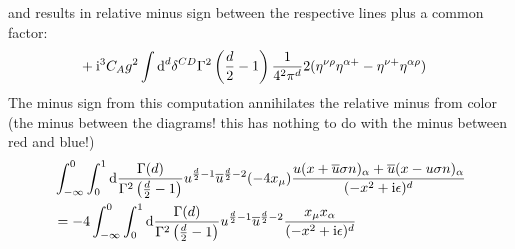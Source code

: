and results in relative minus sign between the respective lines plus a common factor:
\begin{align}
	&+\text{i}^3 C_A g^2 \int \text{d} ^d \delta^{CD}\Gamma^2\left(\frac{d}{2}-1\right)\frac{1}{4^2\pi^d}2(\eta^{\nu \rho} \eta^{\alpha+} - \eta^{\nu +}\eta^{\alpha\rho})
\end{align}
The minus sign from this computation annihilates the relative minus from color (the minus between the diagrams! this has nothing to do with the minus between red and blue!)
{\color{blue}
\begin{align}
	&\int_{-\infty}^{0}\int_0^1 \text{d} \frac{\Gamma(d)}{\Gamma^2\left(\frac{d}{2}-1\right)} u^{\frac{d}{2}-1}\overline u ^{\frac{d}{2}-2}(-4x_\mu)\frac{u(x+\overline u \sigma n)_\alpha + \overline u(x- u\sigma n)_\alpha}{(-x^2+\text{i} \epsilon)^{d}}
	\\
	&=
	-4\int_{-\infty}^{0}\int_0^1 \text{d} \frac{\Gamma(d)}{\Gamma^2\left(\frac{d}{2}-1\right)} u^{\frac{d}{2}-1}\overline u ^{\frac{d}{2}-2}\frac{x_\mu x_\alpha}{(-x^2+\text{i} \epsilon)^{d}}
\end{align}
}

